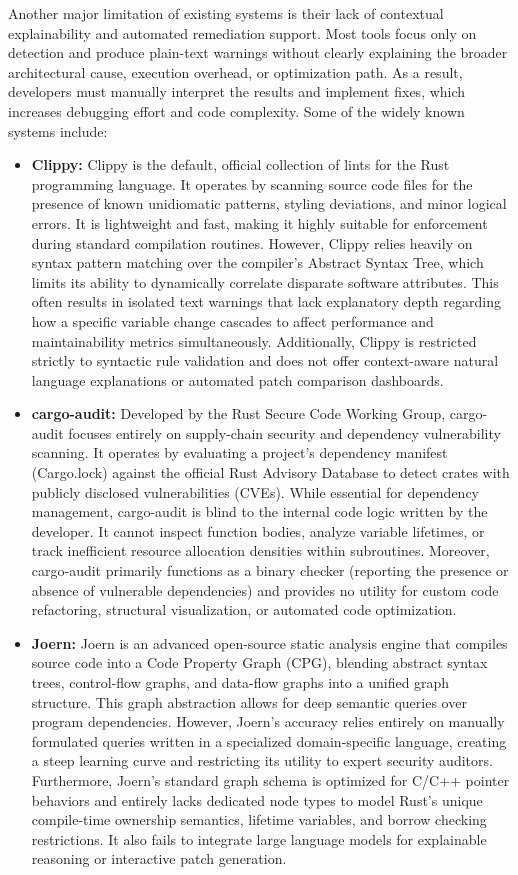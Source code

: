Another major limitation of existing systems is their lack of contextual explainability and automated remediation support. Most tools focus only on detection and produce plain-text warnings without clearly explaining the broader architectural cause, execution overhead, or optimization path. As a result, developers must manually interpret the results and implement fixes, which increases debugging effort and code complexity. Some of the widely known systems include:
\begin{itemize}
    \item \textbf{Clippy:} Clippy is the default, official collection of lints for the Rust programming language. It operates by scanning source code files for the presence of known unidiomatic patterns, styling deviations, and minor logical errors. It is lightweight and fast, making it highly suitable for enforcement during standard compilation routines. However, Clippy relies heavily on syntax pattern matching over the compiler's Abstract Syntax Tree, which limits its ability to dynamically correlate disparate software attributes. This often results in isolated text warnings that lack explanatory depth regarding how a specific variable change cascades to affect performance and maintainability metrics simultaneously. Additionally, Clippy is restricted strictly to syntactic rule validation and does not offer context-aware natural language explanations or automated patch comparison dashboards.
    \item \textbf{cargo-audit:} Developed by the Rust Secure Code Working Group, cargo-audit focuses entirely on supply-chain security and dependency vulnerability scanning. It operates by evaluating a project's dependency manifest (Cargo.lock) against the official Rust Advisory Database to detect crates with publicly disclosed vulnerabilities (CVEs). While essential for dependency management, cargo-audit is blind to the internal code logic written by the developer. It cannot inspect function bodies, analyze variable lifetimes, or track inefficient resource allocation densities within subroutines. Moreover, cargo-audit primarily functions as a binary checker (reporting the presence or absence of vulnerable dependencies) and provides no utility for custom code refactoring, structural visualization, or automated code optimization.
    \item \textbf{Joern:} Joern is an advanced open-source static analysis engine that compiles source code into a Code Property Graph (CPG), blending abstract syntax trees, control-flow graphs, and data-flow graphs into a unified graph structure. This graph abstraction allows for deep semantic queries over program dependencies. However, Joern's accuracy relies entirely on manually formulated queries written in a specialized domain-specific language, creating a steep learning curve and restricting its utility to expert security auditors. Furthermore, Joern's standard graph schema is optimized for C/C++ pointer behaviors and entirely lacks dedicated node types to model Rust’s unique compile-time ownership semantics, lifetime variables, and borrow checking restrictions. It also fails to integrate large language models for explainable reasoning or interactive patch generation.
\end{itemize}

